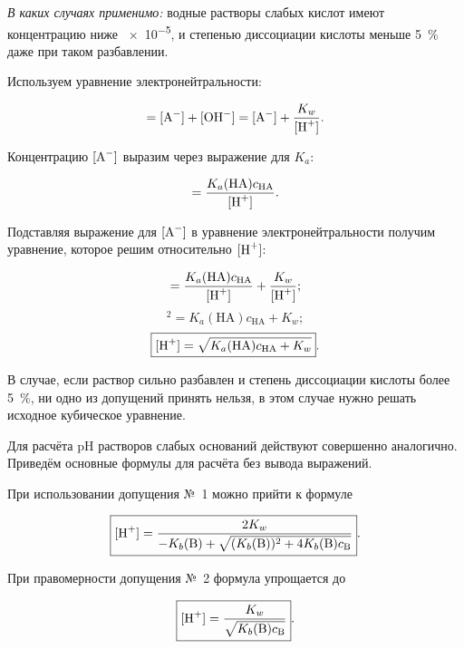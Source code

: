 \textit{В каких случаях применимо:} водные растворы слабых кислот имеют концентрацию ниже \qty{e-5}{\ruMolar}, и степенью диссоциации кислоты меньше \qty{5}{\percent} даже при таком разбавлении.

Используем уравнение электронейтральности:

\begin{equation*}
    [\ce{H^+}] = [\ce{A^-}] + [\ce{OH^-}] = [\ce{A^-}] + \frac{K_w}{[\ce{H^+}]}.
\end{equation*}

Концентрацию $[\ce{A^-}]$ выразим через выражение для $K_a$:

\begin{equation*}
    [\ce{A^-}] = \frac{K_a(\text{HA})c_{\text{HA}}}{[\ce{H^+}]}.
\end{equation*}

Подставляя выражение для $[\ce{A^-}]$ в уравнение электронейтральности получим уравнение, которое решим относительно $[\ce{H^+}]$:

\begin{equation*}
    [\ce{H^+}] = \frac{K_a(\text{HA})c_{\text{HA}}}{[\ce{H^+}]} + \frac{K_w}{[\ce{H^+}]};
\end{equation*}
\begin{equation*}
    [\ce{H^+}]^2 = K_a(\text{HA})c_{\text{HA}} + K_w;
\end{equation*}
\begin{equation}
    \label{eq:assumption_3}
    \boxed{[\ce{H^+}] = \sqrt{K_a(\text{HA})c_{\text{HA}} + K_w}}.
\end{equation}

В случае, если раствор сильно разбавлен и степень диссоциации кислоты более \qty{5}{\percent}, ни одно из допущений принять нельзя, в этом случае нужно решать исходное кубическое уравнение.

Для расчёта pH растворов слабых оснований действуют совершенно аналогично. Приведём основные формулы для расчёта без вывода выражений.

При использовании допущения №~1 можно прийти к формуле

\begin{equation*}
    \boxed{[\ce{H^+}] = \dfrac{2K_w}{-K_b(\text{B}) + \sqrt{(K_b(\text{B}))^2 + 4K_b(\text{B})c_{\text{B}}}}}.
\end{equation*}

При правомерности допущения №~2 формула упрощается до

\begin{equation*}
    \boxed{[\ce{H^+}] = \dfrac{K_w}{\sqrt{K_b(\text{B})c_{\text{B}}}}}.
\end{equation*}

